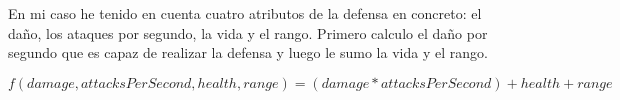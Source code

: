 En mi caso he tenido en cuenta cuatro atributos de la defensa en concreto: el daño, los ataques por segundo, la vida y el rango.
Primero calculo el daño por segundo que es capaz de realizar la defensa y luego le sumo la vida y el rango. 

$$ f(damage, attacksPerSecond, health, range)=(damage * attacksPerSecond) + health + range $$
